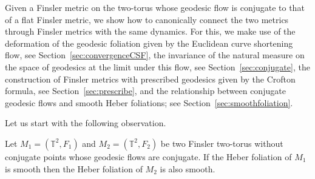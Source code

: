 \documentclass[AHL,Unicode,longabstracts,published]{cedram}
\newcommand{\FF}{\mathcal{F}}
\newcommand{\Z}{\mathbb{Z}}
\newcommand{\T}{\mathbb{T}}
\begin{document}
Given a Finsler metric on the two-torus whose geodesic flow is conjugate to that of a flat Finsler metric, we show how to canonically connect the two metrics through Finsler metrics with the same dynamics. For this, we make use of the deformation of the geodesic foliation given by the Euclidean curve shortening flow, see Section~\ref{sec:convergenceCSF}, the invariance of the natural measure on the space of geodesics at the limit under this flow, see Section~\ref{sec:conjugate}, the construction of Finsler metrics with prescribed geodesics given by the Crofton formula, see Section~\ref{sec:prescribe}, and the relationship between conjugate geodesic flows and smooth Heber foliations; see Section~\ref{sec:smoothfoliation}. 

Let us start with the following observation.

\begin{prop}\label{Heber:Smooth}
Let $M_1=(\T^2,F_{1})$ and $M_2=(\T^2,F_{2})$ be two Finsler two-torus without conjugate points whose geodesic flows are conjugate. If the Heber foliation of $M_{1}$ is smooth then the Heber foliation of $M_{2}$ is also smooth.
\end{prop}

\end{document}
